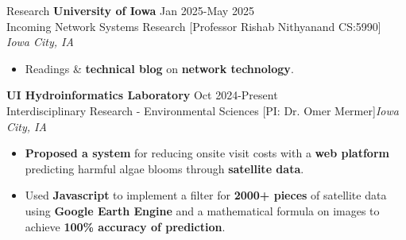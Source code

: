 \documentclass{resume} %
\begin{document}
%
\begin{rSection}{Research}
  \textbf{University of Iowa} \hfill Jan 2025-May 2025\\
  Incoming Network Systems Research [Professor Rishab Nithyanand CS:5990] \hfill \textit{Iowa City, IA}
   \begin{itemize}
    \itemsep -3pt {} 
    \item Readings \& \textbf{technical blog} on \textbf{network technology}.
    \end{itemize}
  
\textbf{UI Hydroinformatics Laboratory} 
\hfill Oct 2024-Present\\
Interdisciplinary Research - Environmental Sciences [PI: Dr. Omer Mermer]\hfill \textit{Iowa City, IA}
 \begin{itemize}
  \itemsep -3pt {} 
  \item \textbf{Proposed a system} for reducing onsite visit costs with a \textbf{web platform} predicting harmful algae blooms through \textbf{satellite data}.
  \item Used \textbf{Javascript} to implement a filter for \textbf{2000+ pieces} of satellite data using \textbf{Google Earth Engine} and a mathematical formula on images to achieve \textbf{100\% accuracy of prediction}.
  \end{itemize}




\end{rSection} 
\end{document}
